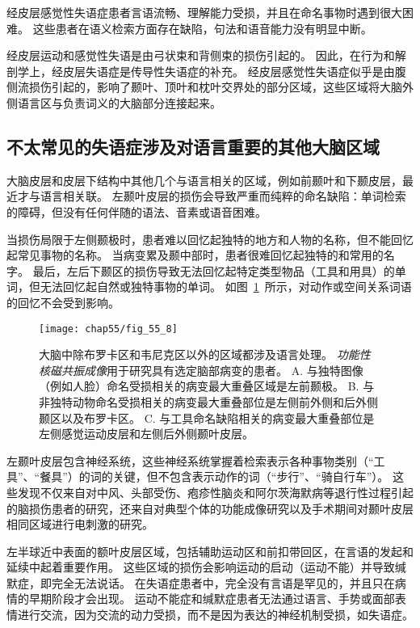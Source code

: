 经皮层感觉性失语症患者言语流畅、理解能力受损，并且在命名事物时遇到很大困难。
这些患者在语义检索方面存在缺陷，句法和语音能力没有明显中断。


经皮层运动和感觉性失语是由弓状束和背侧束的损伤引起的。
因此，在行为和解剖学上，经皮层失语症是传导性失语症的补充。
经皮层感觉性失语症似乎是由腹侧流损伤引起的，影响了颞叶、顶叶和枕叶交界处的部分区域，这些区域将大脑外侧语言区与负责词义的大脑部分连接起来。



\subsection{不太常见的失语症涉及对语言重要的其他大脑区域}

大脑皮层和皮层下结构中其他几个与语言相关的区域，例如前颞叶和下颞皮层，最近才与语言相关联。
左颞叶皮层的损伤会导致严重而纯粹的命名缺陷：单词检索的障碍，但没有任何伴随的语法、音素或语音困难。


当损伤局限于左侧颞极时，患者难以回忆起独特的地方和人物的名称，但不能回忆起常见事物的名称。
当病变累及颞中部时，患者很难回忆起独特的和常用的名字。
最后，左后下颞区的损伤导致无法回忆起特定类型物品（工具和用具）的单词，但无法回忆起自然或独特事物的单词。
如图~\ref{fig:55_8}~所示，对动作或空间关系词语的回忆不会受到影响。


\begin{figure}[htbp]
	\centering
	\texttt{[image: chap55/fig\_55\_8]}
	\caption{大脑中除布罗卡区和韦尼克区以外的区域都涉及语言处理。
		\textit{功能性核磁共振成像}用于研究具有选定脑部病变的患者。
		A. 与独特图像（例如人脸）命名受损相关的病变最大重叠区域是左前颞极。
		B. 与非独特动物命名受损相关的病变最大重叠部位是左侧前外侧和后外侧颞区以及布罗卡区。
		C. 与工具命名缺陷相关的病变最大重叠部位是左侧感觉运动皮层和左侧后外侧颞叶皮层。}
	\label{fig:55_8}
\end{figure}


左颞叶皮层包含神经系统，这些神经系统掌握着检索表示各种事物类别（“工具”、“餐具”）的词的关键，但不包含表示动作的词（“步行”、“骑自行车”）。
这些发现不仅来自对中风、头部受伤、疱疹性脑炎和阿尔茨海默病等退行性过程引起的脑损伤患者的研究，还来自对典型个体的功能成像研究以及手术期间对颞叶皮层相同区域进行电刺激的研究。


左半球近中表面的额叶皮层区域，包括辅助运动区和前扣带回区，在言语的发起和延续中起着重要作用。
这些区域的损伤会影响运动的启动（运动不能）并导致缄默症，即完全无法说话。
在失语症患者中，完全没有言语是罕见的，并且只在病情的早期阶段才会出现。
运动不能症和缄默症患者无法通过语言、手势或面部表情进行交流，因为交流的动力受损，而不是因为表达的神经机制受损，如失语症。


